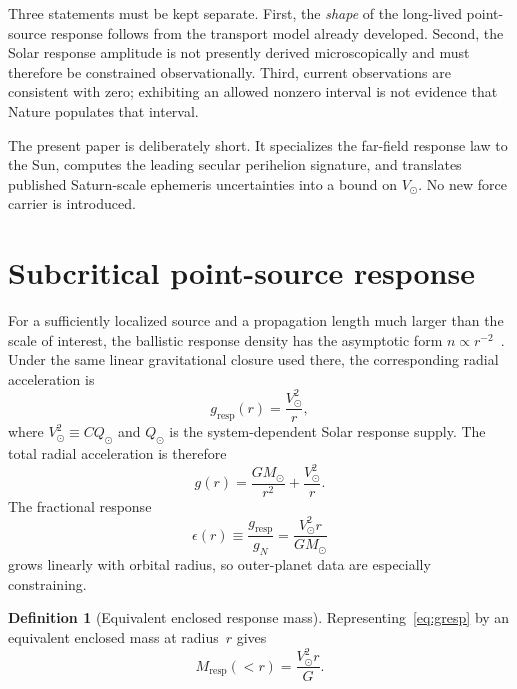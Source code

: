 \documentclass[11pt]{article}
\theoremstyle{definition}
\newtheorem{definition}[theorem]{Definition}
\theoremstyle{remark}
\begin{document}
Three statements must be kept separate.
First, the \emph{shape} of the long-lived point-source response follows from the transport model already developed.
Second, the Solar response amplitude is not presently derived microscopically and must therefore be constrained observationally.
Third, current observations are consistent with zero; exhibiting an allowed nonzero interval is not evidence that Nature populates that interval.

The present paper is deliberately short.
It specializes the far-field response law to the Sun, computes the leading secular perihelion signature, and translates published Saturn-scale ephemeris uncertainties into a bound on $V_\odot$.
No new force carrier is introduced.

\section{Subcritical point-source response}
\label{sec:point-source}
For a sufficiently localized source and a propagation length much larger than the scale of interest, the ballistic response density has the asymptotic form $n\propto r^{-2}$~\cite{boyd2026galactic}.
Under the same linear gravitational closure used there, the corresponding radial acceleration is
\begin{equation}
\label{eq:gresp}
\boxed{g_{\mathrm{resp}}(r)=\frac{V_\odot^{2}}{r},}
\end{equation}
where $V_\odot^{2}\equiv CQ_\odot$ and $Q_\odot$ is the system-dependent Solar response supply.
The total radial acceleration is therefore
\begin{equation}
g(r)=\frac{GM_\odot}{r^{2}}+\frac{V_\odot^{2}}{r}.
\end{equation}
The fractional response
\begin{equation}
\label{eq:epsilon}
\boxed{\epsilon(r)\equiv\frac{g_{\mathrm{resp}}}{g_N}=\frac{V_\odot^{2}r}{GM_\odot}}
\end{equation}
grows linearly with orbital radius, so outer-planet data are especially constraining.

\begin{definition}[Equivalent enclosed response mass]
\label{def:mresp}
Representing~\eqref{eq:gresp} by an equivalent enclosed mass at radius~$r$ gives
\begin{equation}
M_{\mathrm{resp}}(<r)=\frac{V_\odot^{2}r}{G}.
\end{equation}
\end{definition}
\end{document}
